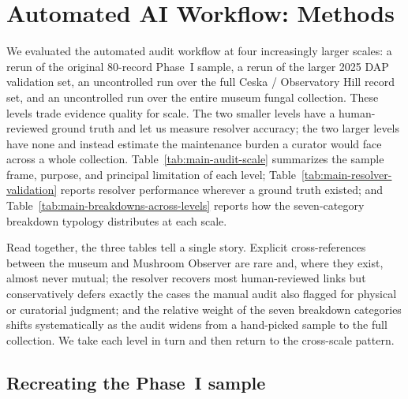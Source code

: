%
%

\section{Automated AI Workflow: Methods}

We evaluated the automated audit workflow at four increasingly larger scales:
a rerun of the original 80-record Phase~I sample, a rerun of the larger 2025 DAP
validation set, an uncontrolled run over the full Ceska / Observatory Hill record
set, and an uncontrolled run over the entire museum fungal collection. These
levels trade evidence quality for scale. The two smaller levels have a
human-reviewed ground truth and let us measure resolver accuracy; the two larger
levels have none and instead estimate the maintenance burden a curator would face
across a whole collection. Table~\ref{tab:main-audit-scale} summarizes the sample
frame, purpose, and principal limitation of each level;
Table~\ref{tab:main-resolver-validation} reports resolver performance wherever a
ground truth existed; and Table~\ref{tab:main-breakdowns-across-levels} reports
how the seven-category breakdown typology distributes at each scale.

Read together, the three tables tell a single story. Explicit cross-references
between the museum and Mushroom Observer are rare and, where they exist, almost
never mutual; the resolver recovers most human-reviewed links but conservatively
defers exactly the cases the manual audit also flagged for physical or curatorial
judgment; and the relative weight of the seven breakdown categories shifts
systematically as the audit widens from a hand-picked sample to the full
collection. We take each level in turn and then return to the cross-scale pattern.

\subsection{Recreating the Phase~I sample}

